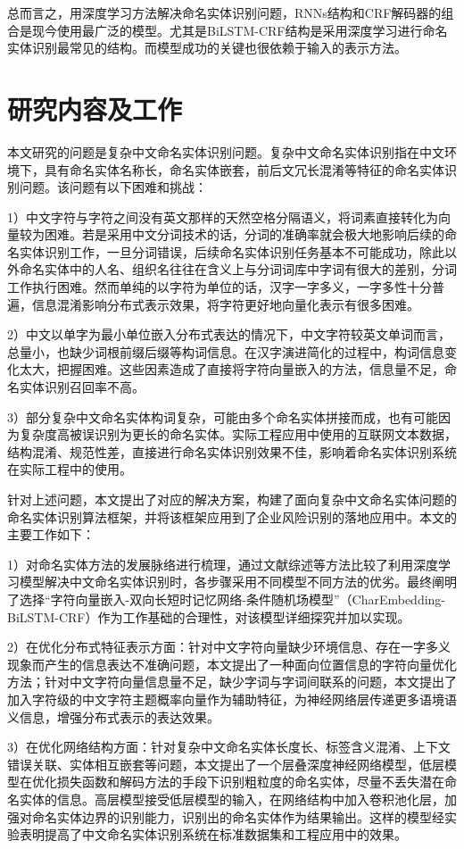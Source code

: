 \documentclass[winfonts,master,oneside,nobackinfo]{njuthesis}
\begin{document}
总而言之，用深度学习方法解决命名实体识别问题，RNNs结构和CRF解码器的组合是现今使用最广泛的模型。尤其是BiLSTM-CRF结构是采用深度学习进行命名实体识别最常见的结构。而模型成功的关键也很依赖于输入的表示方法。

\section{研究内容及工作}
本文研究的问题是复杂中文命名实体识别问题。复杂中文命名实体识别指在中文环境下，具有命名实体名称长，命名实体嵌套，前后文冗长混淆等特征的命名实体识别问题。该问题有以下困难和挑战：

1）中文字符与字符之间没有英文那样的天然空格分隔语义，将词素直接转化为向量较为困难。若是采用中文分词技术的话，分词的准确率就会极大地影响后续的命名实体识别工作，一旦分词错误，后续命名实体识别任务基本不可能成功，除此以外命名实体中的人名、组织名往往在含义上与分词词库中字词有很大的差别，分词工作执行困难。然而单纯的以字符为单位的话，汉字一字多义，一字多性十分普遍，信息混淆影响分布式表示效果，将字符更好地向量化表示有很多困难。

2）中文以单字为最小单位嵌入分布式表达的情况下，中文字符较英文单词而言，总量小，也缺少词根前缀后缀等构词信息。在汉字演进简化的过程中，构词信息变化太大，把握困难。这些因素造成了直接将字符向量嵌入的方法，信息量不足，命名实体识别召回率不高。

3）部分复杂中文命名实体构词复杂，可能由多个命名实体拼接而成，也有可能因为复杂度高被误识别为更长的命名实体。实际工程应用中使用的互联网文本数据，结构混淆、规范性差，直接进行命名实体识别效果不佳，影响着命名实体识别系统在实际工程中的使用。

针对上述问题，本文提出了对应的解决方案，构建了面向复杂中文命名实体问题的命名实体识别算法框架，并将该框架应用到了企业风险识别的落地应用中。本文的主要工作如下：

1）对命名实体方法的发展脉络进行梳理，通过文献综述等方法比较了利用深度学习模型解决中文命名实体识别时，各步骤采用不同模型不同方法的优劣。最终阐明了选择“字符向量嵌入-双向长短时记忆网络-条件随机场模型”（CharEmbedding-BiLSTM-CRF）作为工作基础的合理性，对该模型详细探究并加以实现。

2）在优化分布式特征表示方面：针对中文字符向量缺少环境信息、存在一字多义现象而产生的信息表达不准确问题，本文提出了一种面向位置信息的字符向量优化方法；针对中文字符向量信息量不足，缺少字词与字词间联系的问题，本文提出了加入字符级的中文字符主题概率向量作为辅助特征，为神经网络层传递更多语境语义信息，增强分布式表示的表达效果。

3）在优化网络结构方面：针对复杂中文命名实体长度长、标签含义混淆、上下文错误关联、实体相互嵌套等问题，本文提出了一个层叠深度神经网络模型，低层模型在优化损失函数和解码方法的手段下识别粗粒度的命名实体，尽量不丢失潜在命名实体的信息。高层模型接受低层模型的输入，在网络结构中加入卷积池化层，加强对命名实体边界的识别能力，识别出的命名实体作为结果输出。这样的模型经实验表明提高了中文命名实体识别系统在标准数据集和工程应用中的效果。
\end{document}
